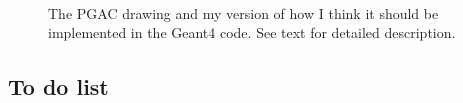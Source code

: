 \documentclass[letter,11pt]{article}
\begin{document}
\begin{figure}
\centering
 	\\
	\caption{The PGAC drawing and my version of how I think it should be implemented in the Geant4 code. See text for detailed description.}
	\label{fig:pgac}
\end{figure}

\subsection{To do list}
\end{document}
